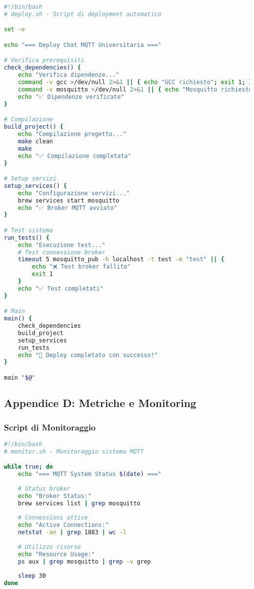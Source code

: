 \documentclass[12pt,a4paper]{article}
\begin{document}
\begin{lstlisting}[language=bash, caption=Deploy Script]
#!/bin/bash
# deploy.sh - Script di deployment automatico

set -e

echo "=== Deploy Chat MQTT Universitaria ==="

# Verifica prerequisiti
check_dependencies() {
    echo "Verifica dipendenze..."
    command -v gcc >/dev/null 2>&1 || { echo "GCC richiesto"; exit 1; }
    command -v mosquitto >/dev/null 2>&1 || { echo "Mosquitto richiesto"; exit 1; }
    echo "✅ Dipendenze verificate"
}

# Compilazione
build_project() {
    echo "Compilazione progetto..."
    make clean
    make
    echo "✅ Compilazione completata"
}

# Setup servizi
setup_services() {
    echo "Configurazione servizi..."
    brew services start mosquitto
    echo "✅ Broker MQTT avviato"
}

# Test sistema
run_tests() {
    echo "Esecuzione test..."
    # Test connessione broker
    timeout 5 mosquitto_pub -h localhost -t test -m "test" || {
        echo "❌ Test broker fallito"
        exit 1
    }
    echo "✅ Test completati"
}

# Main
main() {
    check_dependencies
    build_project
    setup_services
    run_tests
    echo "🚀 Deploy completato con successo!"
}

main "$@"
\end{lstlisting}

\subsection{Appendice D: Metriche e Monitoring}

\subsubsection{Script di Monitoraggio}
\begin{lstlisting}[language=bash, caption=Monitoring Script]
#!/bin/bash
# monitor.sh - Monitoraggio sistema MQTT

while true; do
    echo "=== MQTT System Status $(date) ==="
    
    # Status broker
    echo "Broker Status:"
    brew services list | grep mosquitto
    
    # Connessioni attive
    echo "Active Connections:"
    netstat -an | grep 1883 | wc -l
    
    # Utilizzo risorse
    echo "Resource Usage:"
    ps aux | grep mosquitto | grep -v grep
    
    sleep 30
done
\end{lstlisting}
\end{document}
